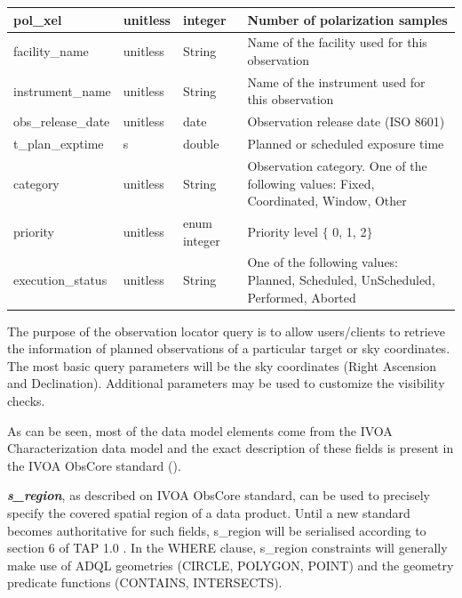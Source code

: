 \documentclass[11pt,a4paper]{ivoa}
\begin{document}
\begin{landscape}
\begin{table}
\begin{tabular}{ |l|l|l|l| }
\hline
pol\_xel &
unitless &
integer &
Number of polarization samples \\
\hline
facility\_name &
unitless &
String &
Name of the facility used for this observation \\
\hline
instrument\_name &
unitless &
String &
Name of the instrument used for this observation \\
\hline
obs\_release\_date &
unitless &
date &
Observation release date (ISO 8601) \\
\hline
t\_plan\_exptime &
s &
double &
Planned or scheduled exposure time \\
\hline
category &
unitless &
String &
Observation category. One of the following values: Fixed, Coordinated, Window, 
Other \\
\hline
priority &
unitless &
enum integer &
Priority level $ \{ $ 0, 1, 2$ \} $ \\
\hline
execution\_status &
unitless &
String &
One of the following values:  Planned, Scheduled, UnScheduled, Performed, Aborted \\
\hline
\end{tabular}
\end{table}
\end{landscape}


The purpose of the observation locator query is to allow users/clients to
retrieve the information of planned observations of a particular target or
sky coordinates. The most basic query parameters will be the sky coordinates
(Right Ascension and Declination). Additional parameters may be used to
customize the visibility checks.

As can be seen, most of the data model elements come from the IVOA
Characterization data model and the exact description of these fields is
present in the IVOA ObsCore standard (\cite{2017ivoa.spec.0509L}).

\textbf{\textit{s\_region}}, as described on IVOA ObsCore standard, can be
used to precisely specify the covered spatial region of a data product. Until
a new standard becomes authoritative for such fields, s\_region will be
serialised according to section 6 of TAP 1.0 \citep{2011ivoa.spec.1028T}. In
the WHERE clause, s\_region constraints will generally make use of ADQL
geometries (CIRCLE, POLYGON, POINT) and the geometry predicate functions
(CONTAINS, INTERSECTS).
\end{document}
